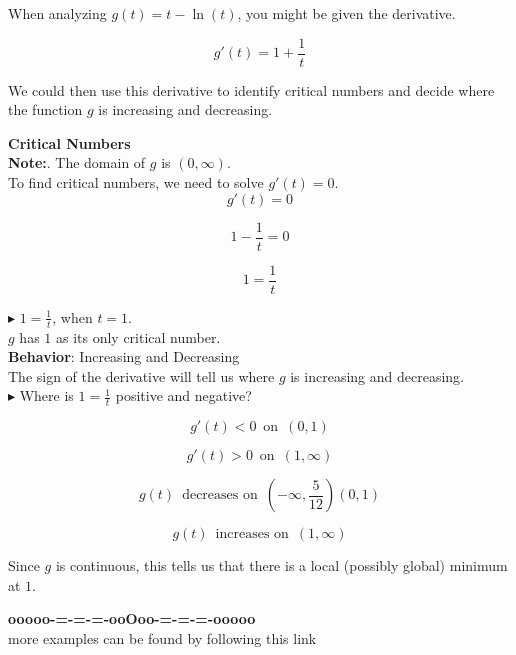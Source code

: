\documentclass{ximera}
\begin{document}
\begin{example}

When analyzing $g(t) = t - \ln(t)$, you might be given the derivative.


\[
g'(t) = 1 + \frac{1}{t} 
\]


We could then use this derivative to identify critical numbers and decide where the function $g$ is increasing and decreasing.




\textbf{Critical Numbers} \\


\textbf{Note:}. The domain of $g$ is $(0, \infty)$. \\



To find critical numbers, we need to solve $g'(t) = 0$. \\


\[
g'(t) = 0
\]


\[
1 - \frac{1}{t}  = 0
\]


\[
1  = \frac{1}{t}
\]





$\blacktriangleright$ $1  = \frac{1}{t}$, when $t = 1$. \\



$g$ has $1$ as its only critical number. \\




\textbf{Behavior}: Increasing and Decreasing \\



The sign of the derivative will tell us where $g$ is increasing and decreasing. \\


\textbf{\textcolor{blue!55!black}{$\blacktriangleright$}} Where is $1  = \frac{1}{t}$ positive and negative?





\[
g'(t) < 0 \, \text{ on } \, (0, 1)
\]


\[
g'(t) > 0 \, \text{ on } \, (1, \infty)
\]





\[
g(t)  \, \text{ decreases on } \, \left( -\infty, \frac{5}{12} \right)(0, 1)
\]


\[
g(t)  \, \text{ increases on } \, (1, \infty)
\]



Since $g$ is continuous, this tells us that there is a local (possibly global) minimum at $1$.


\end{example}













\begin{center}
\textbf{\textcolor{green!50!black}{ooooo-=-=-=-ooOoo-=-=-=-ooooo}} \\

more examples can be found by following this link\\ 

\end{center}
\end{document}
